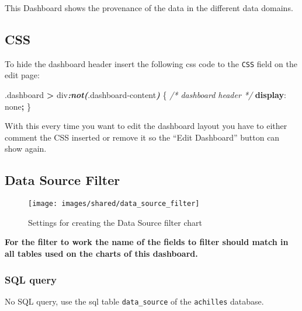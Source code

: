 \documentclass[
]{book}
\newenvironment{Shaded}{\begin{snugshade}}{\end{snugshade}}
\newcommand{\CommentTok}[1]{\textcolor[rgb]{0.56,0.35,0.01}{\textit{#1}}}
\newcommand{\DecValTok}[1]{\textcolor[rgb]{0.00,0.00,0.81}{#1}}
\newcommand{\FunctionTok}[1]{\textcolor[rgb]{0.00,0.00,0.00}{#1}}
\newcommand{\InformationTok}[1]{\textcolor[rgb]{0.56,0.35,0.01}{\textbf{\textit{#1}}}}
\newcommand{\KeywordTok}[1]{\textcolor[rgb]{0.13,0.29,0.53}{\textbf{#1}}}
\newcommand{\NormalTok}[1]{#1}
\newcommand{\OperatorTok}[1]{\textcolor[rgb]{0.81,0.36,0.00}{\textbf{#1}}}
\begin{document}
This Dashboard shows the provenance of the data in the different data domains.

\hypertarget{css-8}{%
\subsection*{CSS}\label{css-8}}

To hide the dashboard header insert the following css code to the \texttt{CSS} field on the edit page:

\begin{Shaded}
\begin{Highlighting}[]
\FunctionTok{.dashboard} \OperatorTok{\textgreater{}}\NormalTok{ div}\InformationTok{:not(}\FunctionTok{.dashboard{-}content}\InformationTok{)}\NormalTok{ \{  }\CommentTok{/* dashboard header */}
  \KeywordTok{display}\NormalTok{: }\DecValTok{none}\OperatorTok{;}
\NormalTok{\}}
\end{Highlighting}
\end{Shaded}

With this every time you want to edit the dashboard layout you have to either comment the CSS inserted
or remove it so the ``Edit Dashboard'' button can show again.

\hypertarget{data-source-filter-5}{%
\subsection*{Data Source Filter}\label{data-source-filter-5}}

\begin{figure}
\texttt{[image: images/shared/data\_source\_filter]} \caption{Settings for creating the Data Source filter chart}\label{fig:dataSourceFilter}
\end{figure}

\textbf{For the filter to work the name of the fields to filter should match in all tables used on the charts of this dashboard.}

\hypertarget{sql-query-31}{%
\subsubsection*{SQL query}\label{sql-query-31}}

No SQL query, use the sql table \texttt{data\_source} of the \texttt{achilles} database.
\end{document}
